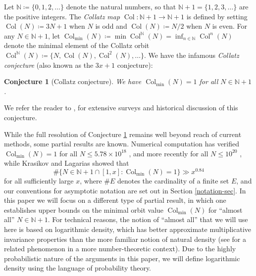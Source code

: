 \documentclass[12pt,a4paper,reqno]{amsart}
\numberwithin{equation}{section}
\theoremstyle{plain}
\newtheorem{conjecture}[theorem]{Conjecture}
\theoremstyle{definition}
\newcommand\N{\mathbb{N}}
\newcommand\Col{{\operatorname{Col}}}
\begin{document}
Let $\N \coloneqq \{0,1,2,\dots\}$ denote the natural numbers, so that $\N+1 = \{1,2,3,\dots\}$ are the positive integers.  The \emph{Collatz map} $\Col \colon \N+1 \to \N+1$ is defined by setting $\Col(N) \coloneqq 3N+1$ when $N$ is odd and $\Col(N) \coloneqq N/2$ when $N$ is even.  For any $N \in \N+1$, let $\Col_{\min}(N) \coloneqq \min \Col^\N(N) = \inf_{n \in \N} \Col^n(N)$ denote the minimal element of the Collatz orbit $\Col^\N(N) \coloneqq \{ N, \Col(N), \Col^2(N), \dots\}$.    We have the infamous \emph{Collatz conjecture} (also known as the $3x+1$ conjecture):

\begin{conjecture}[Collatz conjecture]\label{collatz}  We have $\Col_{\min}(N)=1$ for all $N \in \N+1$.
\end{conjecture}

We refer the reader to \cite{lag}, \cite{chamber} for extensive surveys and historical discussion of this conjecture. 

While the full resolution of Conjecture \ref{collatz} remains well beyond reach of current methods, some partial results are known.
Numerical computation has verified $\Col_{\min}(N)=1$ for all $N \leq 5.78 \times 10^{18}$ \cite{olive}, and more recently for all $N \leq 10^{20}$ \cite{eric}, while Krasikov and Lagarias \cite{kl} showed that
$$ \# \{ N \in \N+1 \cap [1,x]: \Col_{\min}(N) = 1 \} \gg x^{0.84}$$
for all sufficiently large $x$, where $\# E$ denotes the cardinality of a finite set $E$, and our conventions for asymptotic notation are set out in Section \ref{notation-sec}.  In this paper we will focus on a different type of partial result, in which one establishes upper bounds on the minimal orbit value $\Col_{\min}(N)$ for ``almost all'' $N \in \N+1$.  For technical reasons, the notion of ``almost all'' that we will use here is based on logarithmic density, which has better approximate multiplicative invariance properties than the more familiar notion of natural density (see \cite{tao:chowla} for a related phenomenon in a more number-theoretic context).  Due to the highly probabilistic nature of the arguments in this paper, we will define logarithmic density using the language of probability theory. 
\end{document}

